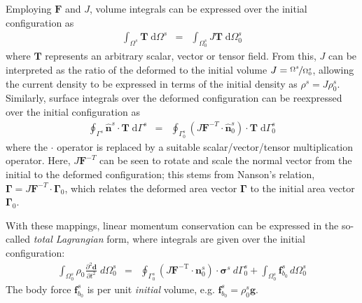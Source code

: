 \documentclass[sn-mathphys,Numbered]{sn-jnl}%
\newcommand{\bb}{\boldsymbol}
\begin{document}
Employing $\bb{F}$ and $J$, volume integrals can be expressed over the initial configuration as
\begin{eqnarray}
    \int_{\Omega^s} \bb{T} \; \text{d}\Omega^s &=& \int_{\Omega_0^s} J \bb{T} \; \text{d}\Omega^s_0
\end{eqnarray}
where $\bb{T}$ represents an arbitrary scalar, vector or tensor field.
From this, $J$ can be interpreted as the ratio of the deformed to the initial volume $J = \nicefrac{\Omega^s}{\Omega_0^s}$, allowing the current density to be expressed in terms of the initial density as $\rho^s = J \rho_0^s$.
Similarly, surface integrals over the deformed configuration can be reexpressed over the initial configuration as
\begin{eqnarray}
    \oint_{\Gamma^s} \hat{\bb{n}}^s \cdot \bb{T} \; \text{d}\Gamma^s &=&
    \oint_{\Gamma_0^s} \left(J \bb{F}^{-T} \cdot \hat{\bb{n}}_0^s \right) \cdot \bb{T} \; \text{d}\Gamma_0^s
\end{eqnarray}
where the $\cdot$ operator is replaced by a suitable scalar/vector/tensor multiplication operator.
Here, $J \bb{F}^{-T}$ can be seen to rotate and scale the normal vector from the initial to the deformed configuration;
this stems from Nanson's relation, $\bb{\Gamma} = J \bb{F}^{-T} \cdot \bb{\Gamma}_0$, which relates the deformed area vector $\bb{\Gamma}$ to the initial area vector $\bb{\Gamma}_0$. 

With these mappings, linear momentum conservation can be expressed in the so-called \emph{total Lagrangian} form, where integrals are given over the initial configuration:
\begin{eqnarray} \label{eqn:solid_momentum_TL}
    \int_{\Omega_0^s} \rho_0 \frac{\partial^2 \bb{d} }{\partial t^2} \; d\Omega_0^s
    &=&
    \oint_{\Gamma_0^s} \left( J \bb{F}^{-\text{T}} \cdot \bb{n}_0^s \right) \cdot \bb{\sigma}^s \ d\Gamma_0^s
    + \int_{\Omega_0^s}  \bb{f}_{b_0}^s \, d\Omega_0^s
\end{eqnarray}
The body force $\bb{f}_{b_0}^s$ is per unit \emph{initial} volume, e.g. $\bb{f}_{b_0}^s = \rho^s_0 \bb{g}$.

\end{document}
